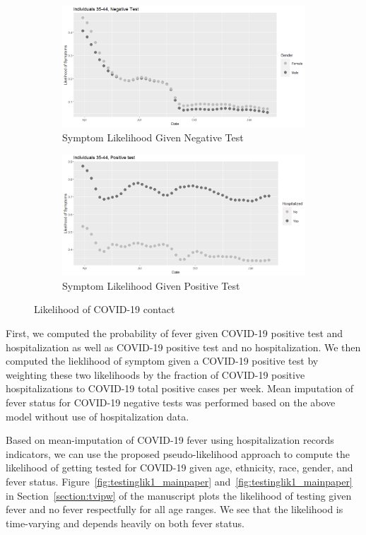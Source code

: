 \documentclass[11pt]{amsart}
\numberwithin{equation}{section}
\theoremstyle{plain}
\begin{document}
\begin{figure}[!th]
\centering
\begin{subfigure}{.5\textwidth}
 \centering
 \includegraphics[width=.9\linewidth]{../figs/tvprop_symptom_alt_fig1.png}
 \caption{Symptom Likelihood Given Negative Test}
 \label{fig:symptomlik1_model2}
\end{subfigure}%
\begin{subfigure}{.5\textwidth}
 \centering
\includegraphics[width=.9\linewidth]{../figs/tvprop_symptom_alt_fig2.png}
 \caption{Symptom Likelihood Given Positive Test}
 \label{fig:symptomlik2_model2}
\end{subfigure}
\caption{Likelihood of COVID-19 contact}
\label{fig:symptomlik}
\end{figure}

First, we computed the probability of fever given COVID-19 positive test and hospitalization as well as COVID-19 positive test and no hospitalization.  We then computed the lieklihood of symptom given a COVID-19 positive test by weighting these two likelihoods by the fraction of COVID-19 positive hospitalizations to COVID-19 total positive cases per week.  Mean imputation of fever status for COVID-19 negative tests was performed based on the above model without use of hospitalization data.

Based on mean-imputation of COVID-19 fever using hospitalization records indicators, we can use the proposed pseudo-likelihood approach to compute the likelihood of getting tested for COVID-19 given age, ethnicity, race, gender, and fever status.  Figure~\ref{fig:testinglik1_mainpaper} and~\ref{fig:testinglik1_mainpaper} in Section~\ref{section:tvipw} of the manuscript plots the likelihood of testing given fever and no fever respectfully for all age ranges.  We see that the likelihood is time-varying and depends heavily on both fever status.
\end{document}
